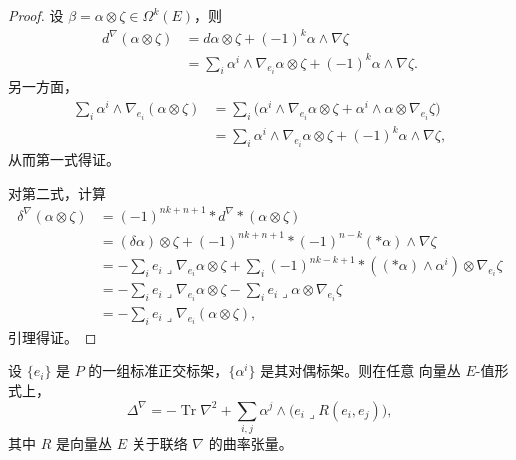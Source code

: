 \begin{proof}
设 $\beta=\alpha\otimes\zeta\in\Omega^k(E)$，则
\begin{align*}
 d^\nabla(\alpha\otimes\zeta)
 &=d\alpha\otimes\zeta+(-1)^k\alpha\wedge\nabla\zeta\\
 &=\sum_i\alpha^i\wedge\nabla_{e_i}\alpha\otimes\zeta
   +(-1)^k\alpha\wedge\nabla\zeta.
\end{align*}
另一方面，
\begin{align*}
 \sum_i\alpha^i\wedge\nabla_{e_i}(\alpha\otimes\zeta)
 &=\sum_i\bigl(\alpha^i\wedge\nabla_{e_i}\alpha\otimes\zeta
   +\alpha^i\wedge\alpha\otimes\nabla_{e_i}\zeta\bigr)\\
 &=\sum_i\alpha^i\wedge\nabla_{e_i}\alpha\otimes\zeta
   +(-1)^k\alpha\wedge\nabla\zeta,
\end{align*}
从而第一式得证。

对第二式，计算
\begin{align*}
 \delta^\nabla(\alpha\otimes\zeta)
 &=(-1)^{nk+n+1}*d^\nabla*(\alpha\otimes\zeta)\\
 &=(\delta\alpha)\otimes\zeta
   +(-1)^{nk+n+1}*(-1)^{n-k}(*\alpha)\wedge\nabla\zeta\\
 &=-\sum_i e_i\mathbin{\lrcorner}\nabla_{e_i}\alpha\otimes\zeta
   +\sum_i(-1)^{nk-k+1}*((*\alpha)\wedge\alpha^i)
      \otimes\nabla_{e_i}\zeta\\
 &=-\sum_i e_i\mathbin{\lrcorner}\nabla_{e_i}\alpha\otimes\zeta
   -\sum_i e_i\mathbin{\lrcorner}\alpha\otimes\nabla_{e_i}\zeta\\
 &=-\sum_i e_i\mathbin{\lrcorner}\nabla_{e_i}(\alpha\otimes\zeta),
\end{align*}
引理得证。
\end{proof}

\begin{theorem}[魏岑伯克公式]
\label{thm:app-a-weizenbock}
设 $\{e_i\}$ 是 $P$ 的一组标准正交标架，$\{\alpha^i\}$ 是其对偶标架。则在任意
向量丛 $E$-值形式上，
\[
 \Delta^\nabla=-\operatorname{Tr}\nabla^2
 +\sum_{i,j}\alpha^j\wedge
   \bigl(e_i\mathbin{\lrcorner}R(e_i,e_j)\bigr),
\]
其中 $R$ 是向量丛 $E$ 关于联络 $\nabla$ 的曲率张量。
\end{theorem}

